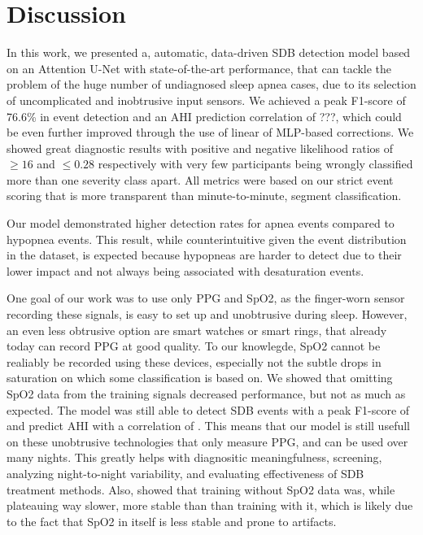 \chapter{Discussion \label{Chapter-Discussion}}


In this work, we presented a, automatic, data-driven SDB detection model based on an Attention U-Net with state-of-the-art performance, that can tackle the problem of the huge number of undiagnosed sleep apnea cases, due to its selection of uncomplicated and inobtrusive input sensors. We achieved a peak F1-score of 76.6\% in event detection and an AHI prediction correlation of ???, which could be even further improved through the use of linear of MLP-based corrections. We showed great diagnostic results with positive and negative likelihood ratios of $\ge 16$ and $\le 0.28$ respectively with very few participants being wrongly classified more than one severity class apart. All metrics were based on our strict event scoring that is more transparent than minute-to-minute, segment classification.

Our model demonstrated higher detection rates for apnea events compared to hypopnea events. This result, while counterintuitive given the event distribution in the dataset, is expected because hypopneas are harder to detect due to their lower impact and not always being associated with desaturation events.

One goal of our work was to use only PPG and SpO2, as the finger-worn sensor recording these signals, is easy to set up and unobtrusive during sleep. However, an even less obtrusive option are smart watches or smart rings, that already today can record PPG at good quality. To our knowlegde, SpO2 cannot be realiably be recorded using these devices, especially not the subtle drops in saturation on which some classification is based on. 
We showed that omitting SpO2 data from the training signals decreased performance, but not as much as expected. The model was still able to detect SDB events with a peak F1-score of  and predict AHI with a correlation of . This means that our model is still usefull on these unobtrusive technologies that only measure PPG, and can be used over many nights. This greatly helps with diagnositic meaningfulness, screening, analyzing night-to-night variability, and evaluating effectiveness of SDB treatment methods.
Also,  showed that training without SpO2 data was, while plateauing way slower, more stable than than training with it, which is likely due to the fact that SpO2 in itself is less stable and prone to artifacts. 

